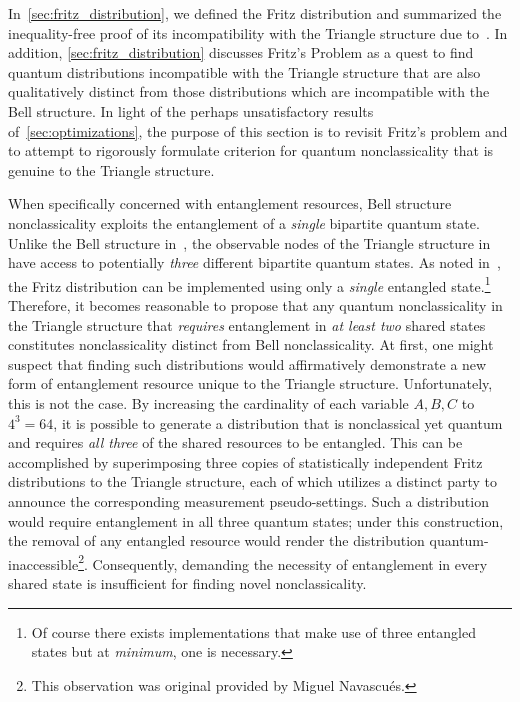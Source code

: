 \documentclass[aps, 10pt, english, twoside, pra, nofootinbib, tightenlines, longbibliography, superscriptaddress]{revtex4-1}
\begin{document}
    In~\cref{sec:fritz_distribution}, we defined the Fritz distribution and summarized the inequality-free proof of its incompatibility with the Triangle structure due to~\cite{Fritz_2012}. In addition, \cref{sec:fritz_distribution} discusses Fritz's Problem as a quest to find quantum distributions incompatible with the Triangle structure that are also qualitatively distinct from those distributions which are incompatible with the Bell structure. In light of the perhaps unsatisfactory results of~\cref{sec:optimizations}, the purpose of this section is to revisit Fritz's problem and to attempt to rigorously formulate criterion for quantum nonclassicality that is genuine to the Triangle structure.

    When specifically concerned with entanglement resources, Bell structure nonclassicality exploits the entanglement of a \textit{single} bipartite quantum state. Unlike the Bell structure in~, the observable nodes of the Triangle structure in~ have access to potentially \textit{three} different bipartite quantum states. As noted in~\cite{Fritz_2012}, the Fritz distribution can be implemented using only a \textit{single} entangled state.\footnote{Of course there exists implementations that make use of three entangled states but at \textit{minimum}, one is necessary.} Therefore, it becomes reasonable to propose that any quantum nonclassicality in the Triangle structure that \textit{requires} entanglement in \textit{at least two} shared states constitutes nonclassicality distinct from Bell nonclassicality. At first, one might suspect that finding such distributions would affirmatively demonstrate a new form of entanglement resource unique to the Triangle structure. Unfortunately, this is not the case. By increasing the cardinality of each variable $A, B, C$ to $4^{3} = 64$, it is possible to generate a distribution that is nonclassical yet quantum and requires \textit{all three} of the shared resources to be entangled. This can be accomplished by superimposing three copies of statistically independent Fritz distributions to the Triangle structure, each of which utilizes a distinct party to announce the corresponding measurement pseudo-settings. Such a distribution would require entanglement in all three quantum states; under this construction, the removal of any entangled resource would render the distribution quantum-inaccessible\footnote{This observation was original provided by Miguel Navascués.}. Consequently, demanding the necessity of entanglement in every shared state is insufficient for finding novel nonclassicality.
\end{document}
